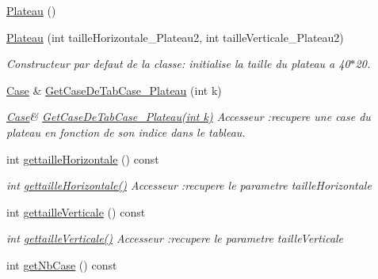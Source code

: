 \begin{DoxyCompactItemize}
\item 
\hyperlink{classPlateau_a07026170529dd928238ee45de0a797d7}{Plateau} ()
\item 
\hyperlink{classPlateau_a4f15309648ec9f987012565f80190b2b}{Plateau} (int taille\+Horizontale\+\_\+\+Plateau2, int taille\+Verticale\+\_\+\+Plateau2)
\begin{DoxyCompactList}\small\item\em Constructeur par defaut de la classe\+: initialise la taille du plateau a 40$\ast$20. \end{DoxyCompactList}\item 
\hyperlink{classCase}{Case} \& \hyperlink{classPlateau_a85da7a234b6e619794b72980250e59dc}{Get\+Case\+De\+Tab\+Case\+\_\+\+Plateau} (int k)
\begin{DoxyCompactList}\small\item\em \hyperlink{classCase}{Case}\& \hyperlink{classPlateau_a85da7a234b6e619794b72980250e59dc}{Get\+Case\+De\+Tab\+Case\+\_\+\+Plateau(int k)} Accesseur \+:recupere une case du plateau en fonction de son indice dans le tableau. \end{DoxyCompactList}\item 
\mbox{\label{classPlateau_a3566ca7f6d1e41ef1762c4171959fa49}} 
int \hyperlink{classPlateau_a3566ca7f6d1e41ef1762c4171959fa49}{gettaille\+Horizontale} () const
\begin{DoxyCompactList}\small\item\em int \hyperlink{classPlateau_a3566ca7f6d1e41ef1762c4171959fa49}{gettaille\+Horizontale()} Accesseur \+:recupere le parametre taille\+Horizontale \end{DoxyCompactList}\item 
\mbox{\label{classPlateau_a74daa0460aa966a5bdb2150d223e3421}} 
int \hyperlink{classPlateau_a74daa0460aa966a5bdb2150d223e3421}{gettaille\+Verticale} () const
\begin{DoxyCompactList}\small\item\em int \hyperlink{classPlateau_a74daa0460aa966a5bdb2150d223e3421}{gettaille\+Verticale()} Accesseur \+:recupere le parametre taille\+Verticale \end{DoxyCompactList}\item 
\mbox{\label{classPlateau_aaa97e7e38b3233a2a66d787a57893ea1}} 
int \hyperlink{classPlateau_aaa97e7e38b3233a2a66d787a57893ea1}{get\+Nb\+Case} () const

\end{DoxyCompactItemize}
